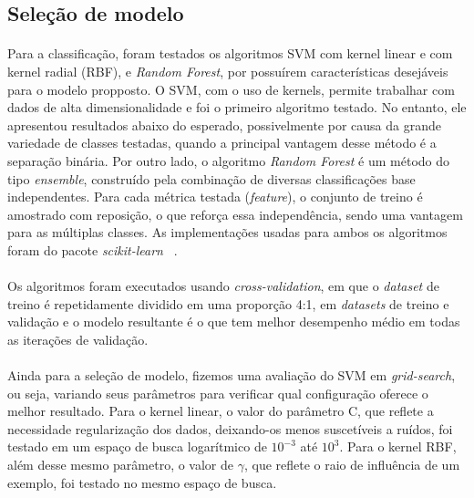        \subsection{Seleção de modelo}
        
            \paragraph{} Para a classificação, foram testados os algoritmos SVM com kernel linear e com kernel radial (RBF), e \textit{Random Forest}, por possuírem características desejáveis para o modelo propposto. O SVM, com o uso de kernels, permite trabalhar com dados de alta dimensionalidade e foi o primeiro algoritmo testado. No entanto, ele apresentou resultados abaixo do esperado, possivelmente por causa da grande variedade de classes testadas, quando a principal vantagem desse método é a separação binária. Por outro lado, o algoritmo \textit{Random Forest} é um método do tipo \textit{ensemble}, construído pela combinação de diversas classificações base independentes. Para cada métrica testada (\textit{feature}), o conjunto de treino é amostrado com reposição, o que reforça essa independência, sendo uma vantagem para as múltiplas classes. As implementações usadas para ambos os algoritmos foram do pacote \textit{scikit-learn} ~\cite{scikit}.
            
            \paragraph{} Os algoritmos foram executados usando \textit{cross-validation}, em que o \textit{dataset} de treino é repetidamente dividido em uma proporção 4:1, em \textit{datasets} de treino e validação e o modelo resultante é o que tem melhor desempenho médio em todas as iterações de validação. 
            
            \paragraph{} Ainda para a seleção de modelo, fizemos uma avaliação do SVM em \textit{grid-search}, ou seja, variando seus parâmetros para verificar qual configuração oferece o melhor resultado. Para o kernel linear, o valor do parâmetro C, que reflete a necessidade regularização dos dados, deixando-os menos suscetíveis a ruídos, foi testado em um espaço de busca logarítmico de $10^{-3}$ até $10^{3}$. Para o kernel RBF, além desse mesmo parâmetro, o valor de $\gamma$, que reflete o raio de influência de um exemplo, foi testado no mesmo espaço de busca.
            
